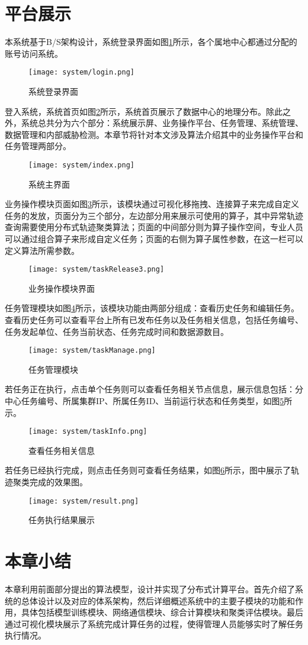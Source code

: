 \section{平台展示}

本系统基于B/S架构设计，系统登录界面如图\ref{login}所示，各个属地中心都通过分配的账号访问系统。
\begin{figure}[h]
	\texttt{[image: system/login.png]}
	\caption{系统登录界面}
	\label{login}
\end{figure}


登入系统，系统首页如图\ref{index}所示，系统首页展示了数据中心的地理分布。除此之外，系统总共分为六个部分：系统展示屏、业务操作平台、任务管理、系统管理、数据管理和内部威胁检测。本章节将针对本文涉及算法介绍其中的业务操作平台和任务管理两部分。
\begin{figure}[h]
	\texttt{[image: system/index.png]}
	\caption{系统主界面}
	\label{index}
\end{figure}

业务操作模块页面如图\ref{taskRelease3}所示，该模块通过可视化移拖拽、连接算子来完成自定义任务的发放，页面分为三个部分，左边部分用来展示可使用的算子，其中异常轨迹查询需要使用分布式轨迹聚类算法；页面的中间部分则为算子操作空间，专业人员可以通过组合算子来形成自定义任务；页面的右侧为算子属性参数，在这一栏可以定义算法所需参数。
\begin{figure}[h]
	\texttt{[image: system/taskRelease3.png]}
	\caption{业务操作模块界面}
	\label{taskRelease3}
\end{figure}

任务管理模块如图\ref{taskManage}所示，该模块功能由两部分组成：查看历史任务和编辑任务。查看历史任务可以查看平台上所有已发布任务以及任务相关信息，包括任务编号、任务发起单位、任务当前状态、任务完成时间和数据源数目。
\begin{figure}[h]
	\texttt{[image: system/taskManage.png]}
	\caption{任务管理模块}
	\label{taskManage}
\end{figure}

若任务正在执行，点击单个任务则可以查看任务相关节点信息，展示信息包括：分中心任务编号、所属集群IP、所属任务ID、当前运行状态和任务类型，如图\ref{taskInfo}所示。
\begin{figure}[h]
	\texttt{[image: system/taskInfo.png]}
	\caption{查看任务相关信息}
	\label{taskInfo}
\end{figure}

若任务已经执行完成，则点击任务则可查看任务结果，如图\ref{result}所示，图中展示了轨迹聚类完成的效果图。
\begin{figure}[h]
	\texttt{[image: system/result.png]}
	\caption{任务执行结果展示}
	\label{result}
\end{figure}

\section{本章小结}

本章利用前面部分提出的算法模型，设计并实现了分布式计算平台。首先介绍了系统的总体设计以及对应的体系架构，然后详细概述系统中的主要子模块的功能和作用，具体包括模型训练模块、网络通信模块、综合计算模块和聚类评估模块。最后通过可视化模块展示了系统完成计算任务的过程，使得管理人员能够实时了解任务执行情况。